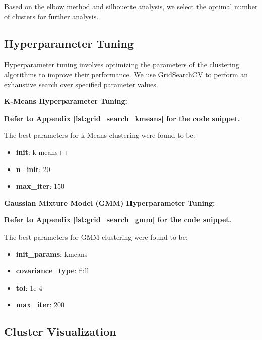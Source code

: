         Based on the elbow method and silhouette analysis, we select the optimal number of clusters for further analysis.
            
    \subsection{Hyperparameter Tuning}
    
        Hyperparameter tuning involves optimizing the parameters of the clustering algorithms to improve their performance. We use GridSearchCV to perform an exhaustive search over specified parameter values.

        \textbf{K-Means Hyperparameter Tuning:}
    
        \vspace{0.5em}

        \textbf{Refer to Appendix \ref{lst:grid_search_kmeans} for the code snippet.}

        The best parameters for k-Means clustering were found to be:
        \begin{itemize}
            \item \textbf{init}: k-means++
            \item \textbf{n\_init}: 20
            \item \textbf{max\_iter}: 150
        \end{itemize}

        \textbf{Gaussian Mixture Model (GMM) Hyperparameter Tuning:}
        
        \vspace{0.5em}

        \textbf{Refer to Appendix \ref{lst:grid_search_gmm} for the code snippet.}

        The best parameters for GMM clustering were found to be:
        \begin{itemize}
            \item \textbf{init\_params}: kmeans
            \item \textbf{covariance\_type}: full
            \item \textbf{tol}: 1e-4
            \item \textbf{max\_iter}: 200
        \end{itemize}

    \subsection{Cluster Visualization}
    
